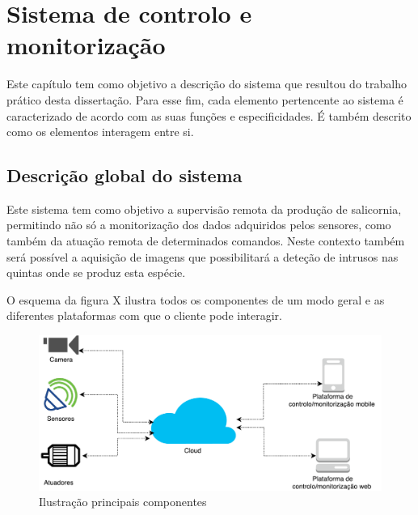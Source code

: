 

\chapter{Sistema de controlo e monitorização}


Este capítulo tem como objetivo a descrição do sistema que resultou do trabalho prático
desta dissertação. Para esse fim, cada elemento pertencente ao sistema é caracterizado de
acordo com as suas funções e especificidades. É também descrito como os elementos interagem
entre si.










\section{Descrição global do sistema}

Este sistema tem como objetivo a supervisão remota da produção de salicornia,  permitindo não só a monitorização dos dados adquiridos pelos sensores, como também da atuação remota de determinados comandos. Neste contexto também será possível a aquisição de imagens que possibilitará a deteção de intrusos nas quintas onde se produz esta espécie.

O esquema da figura X ilustra todos os componentes de um modo geral e as diferentes plataformas com que o cliente pode interagir. 


\begin{figure}[!htb]
	\centering
	\includegraphics[scale=0.45]{esquemas/global_arquitetura.pdf}
	\caption{Ilustração principais componentes}
	\label{dikw}
\end{figure}

